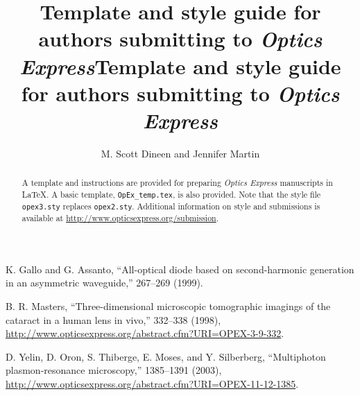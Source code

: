 \documentclass[10pt,letterpaper]{article}
\begin{document}
\title{Template and style guide for authors submitting to \textit{Optics Express}}

\vskip4pc

\tableofcontents
\clearpage

\title{Template and style guide for authors submitting to \textit{Optics Express}}

\author{M. Scott Dineen and Jennifer Martin}

\address{Optics Express Office, Publications Department, Optical Society of America, \\ Washington, D.C., 20036}




\begin{abstract} A template and instructions are provided for preparing \textit{Optics Express} manuscripts in \LaTeX. A basic template, \texttt{OpEx\_temp.tex}, is also provided. Note that the style file \texttt{opex3.sty} replaces \texttt{opex2.sty}. Additional information on style and submissions is available at \mbox{\url{http://www.opticsexpress.org/submission}}.\end{abstract}


\begin{thebibliography}{99}
 K. Gallo and G. Assanto, ``All-optical diode based on second-harmonic generation in an asymmetric waveguide,''  267--269 (1999).
 
 B. R. Masters, ``Three-dimensional microscopic tomographic imagings of the cataract in a human lens in vivo,''  332--338 (1998), \url{http://www.opticsexpress.org/abstract.cfm?URI=OPEX-3-9-332}.
 
 D. Yelin,  D. Oron,  S. Thiberge,  E. Moses, and Y. Silberberg, ``Multiphoton plasmon-resonance microscopy,''  1385--1391 (2003), \url{http://www.opticsexpress.org/abstract.cfm?URI=OPEX-11-12-1385}.
\end{thebibliography}
\end{document}
